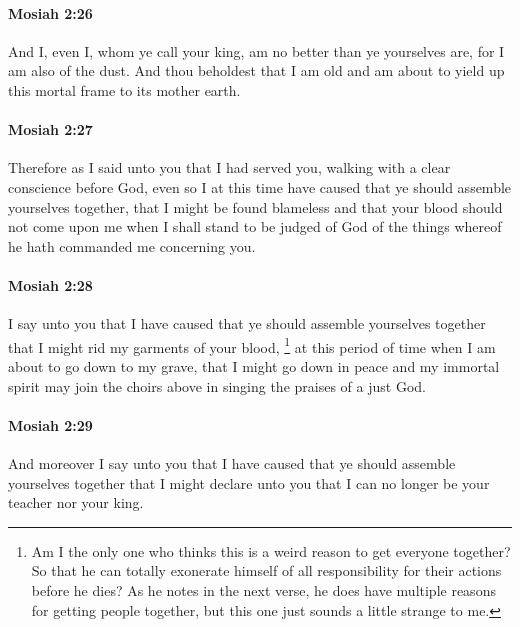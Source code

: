 		\paragraph{Mosiah 2:26} %
			\label{MOSIAH-2-26}
			
			And I, even I, whom ye call your king, am no better than ye yourselves are,
			for I am also of the dust.
			And thou beholdest that I am old
			and am about to yield up this mortal frame to its mother earth.
			
		\paragraph{Mosiah 2:27} %
			\label{MOSIAH-2-27}
			
			Therefore as I said unto you
			that I had served you, walking with a clear conscience before God,
			even so I at this time have caused that ye should assemble yourselves together,
			that I might be found blameless
			and that your blood should not come upon me
			when I shall stand to be judged of God of the things
			whereof he hath commanded me concerning you.
			
		\paragraph{Mosiah 2:28} %
			\label{MOSIAH-2-28}
			
			 I say unto you that I have caused that ye should assemble yourselves together
			that I might rid my garments of your blood,%
				\footnote{%
					\label{MOSIAH-2-28-NOTE-assemble}%
					Am I the only one who thinks this is a weird reason to get everyone together? So that he can totally exonerate himself of all responsibility for their actions before he dies? As he notes in the next verse, he does have multiple reasons for getting people together, but this one just sounds a little strange to me.
					}
			at this period of time when I am about to go down to my grave,
			that I might go down in peace
			and my immortal spirit may join the choirs above
			in singing the praises of a just God.
		
		\paragraph{Mosiah 2:29} %
			\label{MOSIAH-2-29}
			
			And moreover I say unto you
			that I have caused that ye should assemble yourselves together
			that I might declare unto you
			that I can no longer be your teacher nor your king.
		
